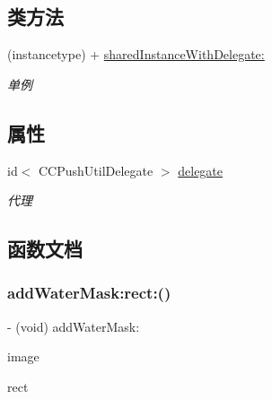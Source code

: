 \subsection*{类方法}
\begin{DoxyCompactItemize}
\item 
\mbox{\label{interface_c_c_push_util_a396d99b6f9303e7d8bd82dbbee7da035}} 
(instancetype) + \hyperlink{interface_c_c_push_util_a396d99b6f9303e7d8bd82dbbee7da035}{shared\+Instance\+With\+Delegate\+:}
\begin{DoxyCompactList}\small\item\em 单例 \end{DoxyCompactList}\end{DoxyCompactItemize}
\subsection*{属性}
\begin{DoxyCompactItemize}
\item 
\mbox{\label{interface_c_c_push_util_a2ac7997a7c1025f24df8a4707fe8d9e1}} 
id$<$ C\+C\+Push\+Util\+Delegate $>$ \hyperlink{interface_c_c_push_util_a2ac7997a7c1025f24df8a4707fe8d9e1}{delegate}
\begin{DoxyCompactList}\small\item\em 代理 \end{DoxyCompactList}\end{DoxyCompactItemize}


\subsection{函数文档}
\mbox{\label{interface_c_c_push_util_ac6be9fb2ae7ecd8370ebe7f918aa4685}} 
\subsubsection{\texorpdfstring{add\+Water\+Mask\+:rect\+:()}{addWaterMask:rect:()}}
{\footnotesize\ttfamily -\/ (void) add\+Water\+Mask\+: \begin{DoxyParamCaption}\item[{(U\+I\+Image $\ast$)}]{image }\item[{rect:(C\+G\+Rect)}]{rect }\end{DoxyParamCaption}}



